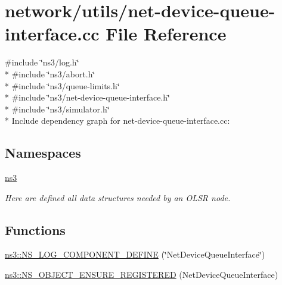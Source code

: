 \hypertarget{net-device-queue-interface_8cc}{}\section{network/utils/net-\/device-\/queue-\/interface.cc File Reference}
\label{net-device-queue-interface_8cc}
{\ttfamily \#include \char`\"{}ns3/log.\+h\char`\"{}}\\*
{\ttfamily \#include \char`\"{}ns3/abort.\+h\char`\"{}}\\*
{\ttfamily \#include \char`\"{}ns3/queue-\/limits.\+h\char`\"{}}\\*
{\ttfamily \#include \char`\"{}ns3/net-\/device-\/queue-\/interface.\+h\char`\"{}}\\*
{\ttfamily \#include \char`\"{}ns3/simulator.\+h\char`\"{}}\\*
Include dependency graph for net-\/device-\/queue-\/interface.cc\+:
\subsection*{Namespaces}
\begin{DoxyCompactItemize}
\item 
 \hyperlink{namespacens3}{ns3}
\begin{DoxyCompactList}\small\item\em Here are defined all data structures needed by an O\+L\+SR node. \end{DoxyCompactList}\end{DoxyCompactItemize}
\subsection*{Functions}
\begin{DoxyCompactItemize}
\item 
\hyperlink{namespacens3_a2e70eeb730fcf16a188451c678763315}{ns3\+::\+N\+S\+\_\+\+L\+O\+G\+\_\+\+C\+O\+M\+P\+O\+N\+E\+N\+T\+\_\+\+D\+E\+F\+I\+NE} (\char`\"{}Net\+Device\+Queue\+Interface\char`\"{})
\item 
\hyperlink{namespacens3_afd949df96c2d6fcfb990c4d48d094748}{ns3\+::\+N\+S\+\_\+\+O\+B\+J\+E\+C\+T\+\_\+\+E\+N\+S\+U\+R\+E\+\_\+\+R\+E\+G\+I\+S\+T\+E\+R\+ED} (Net\+Device\+Queue\+Interface)
\end{DoxyCompactItemize}
